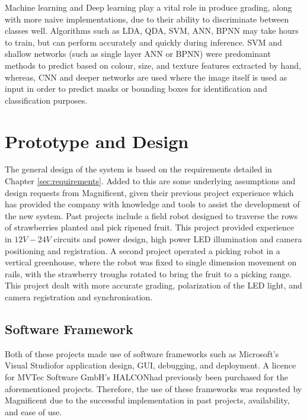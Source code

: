 \documentclass[fleqn,twoside,12pt]{report}
\begin{document}
Machine learning and Deep learning play a vital role in produce grading, along with more naive implementations, due to their ability to discriminate between classes well. Algorithms such as LDA, QDA, SVM, ANN, BPNN may take hours to train, but can perform accurately and quickly during inference. SVM and shallow networks (such as single layer ANN or BPNN) were predominant methods to predict based on colour, size, and texture features extracted by hand, whereas, CNN and deeper networks are used where the image itself is used as input in order to predict masks or bounding boxes for identification and classification purposes.



 


\newpage

\chapter{Prototype and Design}
\label{sec:I}

The general design of the system is based on the requirements detailed in Chapter \ref{sec:requirements}. Added to this are some underlying assumptions and design requests from Magnificent, given their previous project experience which has provided the company with knowledge and tools to assist the development of the new system. Past projects include a field robot designed to traverse the rows of strawberries planted and pick ripened fruit. This project provided experience in $12V-24V$ circuits and power design, high power LED illumination and camera positioning and registration. A second project operated a picking robot in a vertical greenhouse, where the robot was fixed to single dimension movement on rails, with the strawberry troughs rotated to bring the fruit to a picking range. This project dealt with more accurate grading, polarization of the LED light, and camera registration and synchronisation. 


\section{Software Framework}

Both of these projects made use of software frameworks such as Microsoft's Visual Studio\textregistered for application design, GUI, debugging, and deployment. A licence for MVTec Software GmbH's HALCON\texttrademark had previously been purchased for the aforementioned projects. Therefore, the use of these frameworks was requested by Magnificent due to the successful implementation in past projects, availability, and ease of use.
\end{document}
